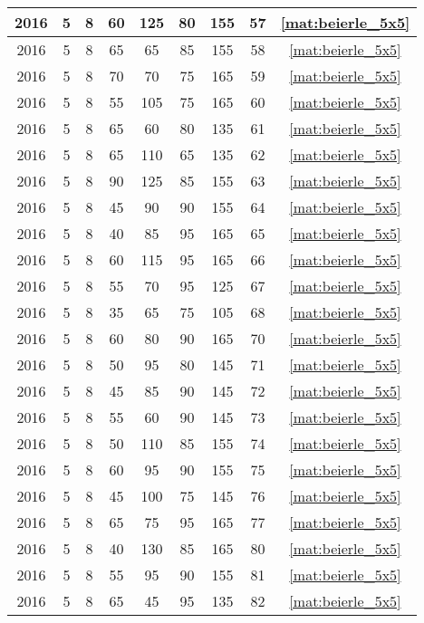 \begin{longtable}{|c|c|c|c|c|c|c|c|c|}
2016 & 5 & 8 & 60 & 125 & 80 & 155 & 57 & \eqref{mat:beierle_5x5} \\ \hline 
2016 & 5 & 8 & 65 & 65 & 85 & 155 & 58 & \eqref{mat:beierle_5x5} \\ \hline 
2016 & 5 & 8 & 70 & 70 & 75 & 165 & 59 & \eqref{mat:beierle_5x5} \\ \hline 
2016 & 5 & 8 & 55 & 105 & 75 & 165 & 60 & \eqref{mat:beierle_5x5} \\ \hline 
2016 & 5 & 8 & 65 & 60 & 80 & 135 & 61 & \eqref{mat:beierle_5x5} \\ \hline 
2016 & 5 & 8 & 65 & 110 & 65 & 135 & 62 & \eqref{mat:beierle_5x5} \\ \hline 
2016 & 5 & 8 & 90 & 125 & 85 & 155 & 63 & \eqref{mat:beierle_5x5} \\ \hline 
2016 & 5 & 8 & 45 & 90 & 90 & 155 & 64 & \eqref{mat:beierle_5x5} \\ \hline 
2016 & 5 & 8 & 40 & 85 & 95 & 165 & 65 & \eqref{mat:beierle_5x5} \\ \hline 
2016 & 5 & 8 & 60 & 115 & 95 & 165 & 66 & \eqref{mat:beierle_5x5} \\ \hline 
2016 & 5 & 8 & 55 & 70 & 95 & 125 & 67 & \eqref{mat:beierle_5x5} \\ \hline 
2016 & 5 & 8 & 35 & 65 & 75 & 105 & 68 & \eqref{mat:beierle_5x5} \\ \hline 
2016 & 5 & 8 & 60 & 80 & 90 & 165 & 70 & \eqref{mat:beierle_5x5} \\ \hline 
2016 & 5 & 8 & 50 & 95 & 80 & 145 & 71 & \eqref{mat:beierle_5x5} \\ \hline 
2016 & 5 & 8 & 45 & 85 & 90 & 145 & 72 & \eqref{mat:beierle_5x5} \\ \hline 
2016 & 5 & 8 & 55 & 60 & 90 & 145 & 73 & \eqref{mat:beierle_5x5} \\ \hline 
2016 & 5 & 8 & 50 & 110 & 85 & 155 & 74 & \eqref{mat:beierle_5x5} \\ \hline 
2016 & 5 & 8 & 60 & 95 & 90 & 155 & 75 & \eqref{mat:beierle_5x5} \\ \hline 
2016 & 5 & 8 & 45 & 100 & 75 & 145 & 76 & \eqref{mat:beierle_5x5} \\ \hline 
2016 & 5 & 8 & 65 & 75 & 95 & 165 & 77 & \eqref{mat:beierle_5x5} \\ \hline 
2016 & 5 & 8 & 40 & 130 & 85 & 165 & 80 & \eqref{mat:beierle_5x5} \\ \hline 
2016 & 5 & 8 & 55 & 95 & 90 & 155 & 81 & \eqref{mat:beierle_5x5} \\ \hline 
2016 & 5 & 8 & 65 & 45 & 95 & 135 & 82 & \eqref{mat:beierle_5x5} \\ \hline 

\end{longtable}
